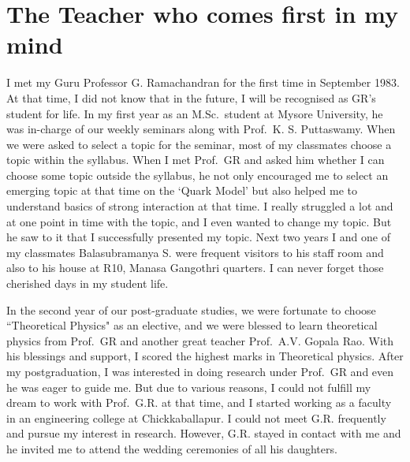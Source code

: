 \chapter{The Teacher who comes first in my mind}\label{chap33}




I met my Guru Professor G. Ramachandran for the first time in September 1983. At that time, I did not know that in the future, I will be recognised as GR's student for life. In my first year as an M.Sc.\ student at Mysore University, he was in-charge of our weekly seminars along with Prof.\ K. S. Puttaswamy. When we were asked to select a topic for the seminar, most of my classmates choose a topic within the syllabus. When I met Prof.\ GR and asked him whether I can choose some topic outside the syllabus, he not only encouraged me to select an emerging topic at that time on the `Quark Model' but also helped me to understand basics of strong interaction at that time. I really struggled a lot and at one point in time with the topic, and I even wanted to change my topic. But he saw to it that I successfully presented my topic. Next two years I and one of my classmates Balasubramanya S. were frequent visitors to his staff room and also to his house at R10, Manasa Gangothri quarters. I can never forget those cherished days in my student life. 

In the second year of our post-graduate studies, we were fortunate to choose ``Theoretical Physics" as an elective, and we were blessed to learn theoretical physics from Prof.\ GR and another great teacher Prof.\ A.V. Gopala Rao. With his blessings and support, I scored the highest marks in Theoretical physics. After my postgraduation, I was interested in doing research under Prof.\ GR and even he was eager to guide me. But due to various reasons, I could not fulfill my dream to work with Prof.\ G.R. at that time, and I started working as a faculty in an engineering college at Chickkaballapur. I could not meet G.R. frequently and pursue my interest in research. However, G.R. stayed in contact with me and he invited me to attend the wedding ceremonies of all his daughters. 

